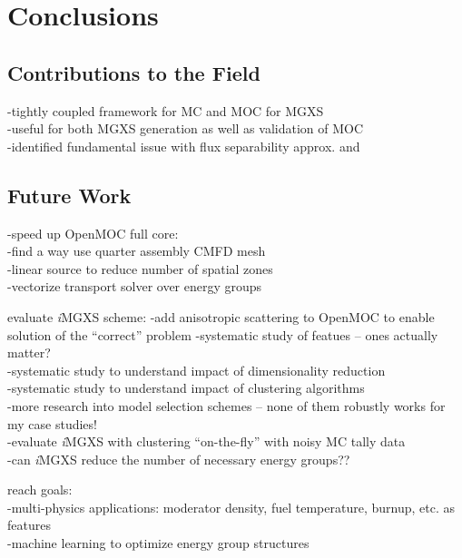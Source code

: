 \documentclass[12pt,twoside]{mitthesis-exec}
\begin{document}
\section*{Conclusions}

\subsection*{Contributions to the Field}

-tightly coupled framework for MC and MOC for MGXS \\
-useful for both MGXS generation as well as validation of MOC \\
-identified fundamental issue with flux separability approx. and 

\subsection*{Future Work}

-speed up OpenMOC full core: \\
  -find a way use quarter assembly CMFD mesh \\
  -linear source to reduce number of spatial zones \\
  -vectorize transport solver over energy groups \\

\break

evaluate \textit{i}MGXS scheme:
-add anisotropic scattering to OpenMOC to enable solution of the ``correct'' problem
-systematic study of featues -- ones actually matter? \\
-systematic study to understand impact of dimensionality reduction \\
-systematic study to understand impact of clustering algorithms \\
-more research into model selection schemes -- none of them robustly works for my case studies! \\
-evaluate \textit{i}MGXS with clustering ``on-the-fly'' with noisy MC tally data \\
-can \textit{i}MGXS reduce the number of necessary energy groups?? \\

\break

reach goals:\\
-multi-physics applications: moderator density, fuel temperature, burnup, etc. as features \\
-machine learning to optimize energy group structures \\



\begin{singlespace}


\end{singlespace}
\end{document}
